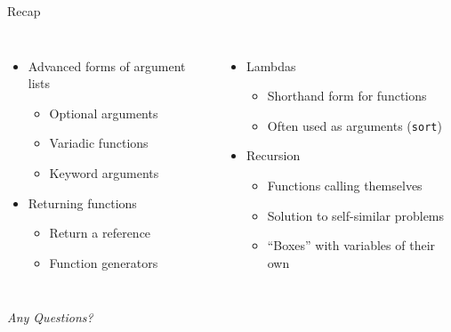 
\begin{frame}[t,plain]
\titlepage
\end{frame}


\begin{frame}{Recap}
%
\begin{columns}[T]
\begin{itemize}
\item Advanced forms of argument lists
	\begin{itemize}
	\item Optional arguments
	\item Variadic functions
	\item Keyword arguments
	\end{itemize}
\item Returning functions
	\begin{itemize}
	\item Return a reference
	\item Function generators
	\end{itemize}
\end{itemize}
%
\begin{itemize}
\item Lambdas
	\begin{itemize}
	\item Shorthand form for functions
	\item Often used as arguments (\thus \texttt{sort})
	\end{itemize}
\item Recursion
	\begin{itemize}
	\item Functions calling themselves
	\item Solution to self-similar problems
	\item \enquote{Boxes} with variables of their own
	\end{itemize}
\end{itemize}

\end{columns}
%
\begin{center}
	\emph{Any Questions?}
\end{center}
%
\end{frame}

